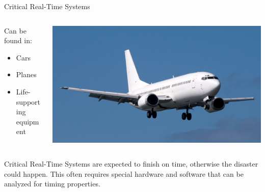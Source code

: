 \documentclass{beamer}
\begin{document}
\begin{frame}{Critical Real-Time Systems}
    \begin{columns}
        \begin{column}{0.5\textwidth}
            \begin{block}{Can be found in:}
                \begin{itemize}
                    \item Cars 
                    \item Planes
                    \item Life-supporting equipment
                \end{itemize}
            \end{block}
        \end{column}

        \begin{column}{0.5\textwidth}
            \includegraphics[width=\textwidth]{pic/plane.png}
        \end{column}
    \end{columns}

    \hfill \break
    \hfill \break

    Critical Real-Time Systems are expected to finish on time, otherwise the disaster could happen. This often requires special hardware and software that can be analyzed for timing properties.
    
\end{frame}
\end{document}
